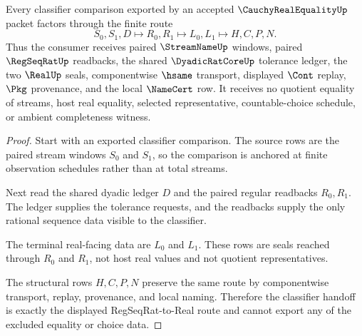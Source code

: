 \begin{theorem}
\label{thm:cauchy-real-equality-regseqrat-classifier-handoff}
Every classifier comparison exported by an accepted $\CauchyRealEqualityUp$ packet factors through the finite route
$$
S_0,S_1,D \longmapsto R_0,R_1 \longmapsto L_0,L_1 \longmapsto H,C,P,N .
$$
Thus the consumer receives paired $\StreamNameUp$ windows, paired $\RegSeqRatUp$ readbacks, the shared $\DyadicRatCoreUp$ tolerance ledger, the two $\RealUp$ seals, componentwise $\hsame$ transport, displayed $\Cont$ replay, $\Pkg$ provenance, and the local $\NameCert$ row. It receives no quotient equality of streams, host real equality, selected representative, countable-choice schedule, or ambient completeness witness.
\end{theorem}
\begin{proof}
Start with an exported classifier comparison. The source rows are the paired stream windows $S_0$ and $S_1$, so the comparison is anchored at finite observation schedules rather than at total streams.

Next read the shared dyadic ledger $D$ and the paired regular readbacks $R_0,R_1$. The ledger supplies the tolerance requests, and the readbacks supply the only rational sequence data visible to the classifier.

The terminal real-facing data are $L_0$ and $L_1$. These rows are seals reached through $R_0$ and $R_1$, not host real values and not quotient representatives.

The structural rows $H,C,P,N$ preserve the same route by componentwise transport, replay, provenance, and local naming. Therefore the classifier handoff is exactly the displayed RegSeqRat-to-Real route and cannot export any of the excluded equality or choice data.
\end{proof}


\begin{closurestatus}{\CauchyRealEqualityUp}
  \theoryclosure{\seedClosure}
  \formalstatus{\unformalizedV}
\end{closurestatus}
